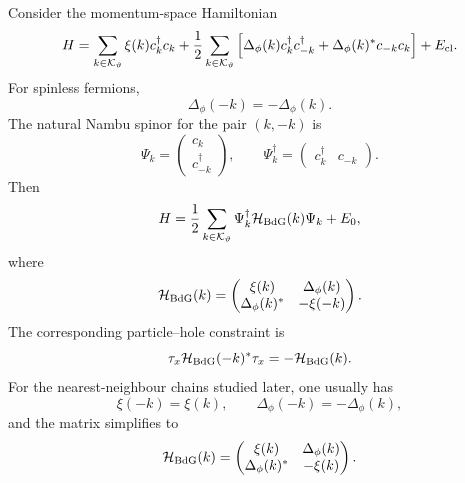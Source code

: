 Consider the momentum-space Hamiltonian
\begin{equation}
\label{eq:bdg-chapter-general-momentum-hamiltonian}
    H
    =
    \sum_{k\in\mathcal{K}_\vartheta}\xi(k)c_k^\dagger c_k
    +\frac12\sum_{k\in\mathcal{K}_\vartheta}
    \left[
        \Delta_\phi(k)c_k^\dagger c_{-k}^\dagger
        +\Delta_\phi(k)^*c_{-k}c_k
    \right]
    +E_{\rm cl}.
\end{equation}
For spinless fermions,
\begin{equation}
\label{eq:bdg-chapter-odd-gap}
    \Delta_\phi(-k)=-\Delta_\phi(k).
\end{equation}
The natural Nambu spinor for the pair $(k,-k)$ is
\begin{equation}
\label{eq:bdg-chapter-nambu-spinor}
    \Psi_k
    =
    \begin{pmatrix}
        c_k\\
        c_{-k}^\dagger
    \end{pmatrix},
    \qquad
    \Psi_k^\dagger
    =
    \begin{pmatrix}
        c_k^\dagger&c_{-k}
    \end{pmatrix}.
\end{equation}
Then
\begin{equation}
\label{eq:bdg-chapter-block-form}
    H
    =
    \frac12\sum_{k\in\mathcal{K}_\vartheta}
    \Psi_k^\dagger\mathcal{H}_{\rm BdG}(k)\Psi_k
    +E_0,
\end{equation}
where
\begin{equation}
\label{eq:bdg-chapter-block-matrix}
    \mathcal{H}_{\rm BdG}(k)
    =
    \begin{pmatrix}
        \xi(k) & \Delta_\phi(k)\\
        \Delta_\phi(k)^* & -\xi(-k)
    \end{pmatrix}.
\end{equation}
The corresponding particle--hole constraint is
\begin{equation}
\label{eq:bdg-chapter-phs-momentum}
    \tau_x\mathcal{H}_{\rm BdG}(-k)^*\tau_x
    =
    -\mathcal{H}_{\rm BdG}(k).
\end{equation}
For the nearest-neighbour chains studied later, one usually has
\begin{equation}
    \xi(-k)=\xi(k),
    \qquad
    \Delta_\phi(-k)=-\Delta_\phi(k),
\end{equation}
and the matrix simplifies to
\begin{equation}
\label{eq:bdg-chapter-even-dispersion-block}
    \mathcal{H}_{\rm BdG}(k)
    =
    \begin{pmatrix}
        \xi(k) & \Delta_\phi(k)\\
        \Delta_\phi(k)^* & -\xi(k)
    \end{pmatrix}.
\end{equation}

